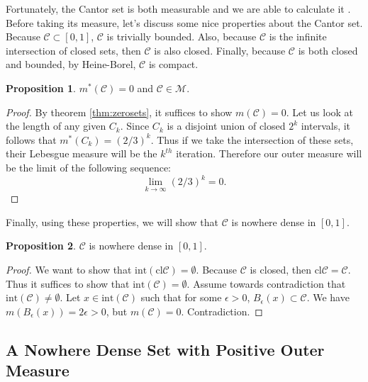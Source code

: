 \documentclass{article}
\theoremstyle{axiom} \newtheorem{axiom}{Axiom}
\theoremstyle{definition} \newtheorem{definition}{Definition}
\theoremstyle{example} \newtheorem{example}{Example}
\theoremstyle{proposition} \newtheorem{prop}{Proposition}
\theoremstyle{lemma} \newtheorem{lemma}{Lemma}
\newcommand{\sC}{\mathcal{C}}  \newcommand{\sD}{\mathcal{D}}
\newcommand{\sM}{\mathcal{M}}  \newcommand{\sN}{\mathcal{N}}
\begin{document}
Fortunately, the Cantor set is both  measurable and we are able to calculate it 
\cite{stein:2005}. Before taking its measure, let's discuss some nice properties 
about the Cantor set. Because $\sC \subset [0,1]$, $\sC$ is trivially bounded.
Also, because $\sC$ is the infinite intersection of closed sets, then $\sC$ is
also closed. Finally, because $\sC$ is both closed and bounded, by Heine-Borel,
$\sC$ is compact.

\begin{prop}
	$m^*(\sC) = 0$ and $\sC \in \sM$.
\end{prop}
\begin{proof}	
	By theorem \ref{thm:zerosets}, it suffices to show $m(\sC) = 0$.
	Let us look at the length of any given $C_k$. Since $C_k$ is a disjoint
	union of closed $2^k$ intervals, it follows that $m^*(C_k) = (2/3)^k$.
	Thus if we take the intersection of these sets, their Lebesgue measure will be 
	the $k^{th}$ iteration. Therefore our outer measure will be the limit of the 
	following sequence:
	\begin{equation*}
		\lim_{k\rightarrow \infty} (2/3)^k = 0. 
	\end{equation*}
\end{proof}

Finally, using these properties, we will show that $\sC$ is nowhere dense in
$[0,1]$. 

\begin{prop}
	$\sC$ is nowhere dense in $[0,1]$.
\end{prop}
\begin{proof}
	We want to show that $\mathrm{int}(\mathrm{cl} \sC) = \emptyset$. 
	Because $\sC$ is closed, then $\mathrm{cl} \sC = \sC$. Thus it suffices to
	show that  $\mathrm{int}(\sC) = \emptyset$. Assume towards contradiction
	that $\mathrm{int}(\sC)\neq \emptyset$. Let $x \in \mathrm{int}(\sC)$
	such that for some $\epsilon > 0$, $B_{\epsilon}(x) \subset \sC$. 
	We have $m(B_{\epsilon}(x)) = 2\epsilon >0$, but $m(\sC) = 0$. Contradiction.
\end{proof}

\subsection{A Nowhere Dense Set with Positive Outer Measure} \label{sec:fatcantor}
\end{document}
